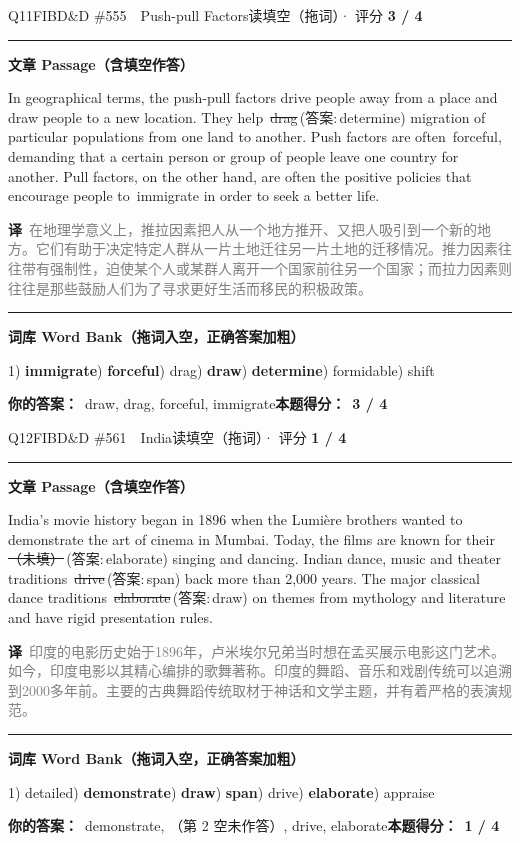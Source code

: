 \documentclass[11pt]{article}
\newcommand{\ptesub}[1]{%
  \par\needspace{2\baselineskip}\smallskip
  {\color{cAccent}\rule[-0.2ex]{3pt}{1.05em}}\hspace{6pt}%
  {\bfseries\color{cHead}#1}\par\nopagebreak\smallskip}
\newcommand{\zh}[1]{{\footnotesize\textcolor{cNote}{\textbf{译}}\ \textcolor{gray}{#1}}}
\newcommand{\rok}[1]{{\color{cFix}\ding{51}\,#1}}                 %
\newcommand{\rno}[2]{{\color{cWrong}\ding{55}\,\sout{#1}}\,{\footnotesize\color{cFix}(答案:\,#2)}}  %
\begin{document}
\begin{qblock}{Q11\quad FIBD\&D \#555\ \ Push-pull Factors}{读填空（拖词）· 评分 \textcolor{cAccent}{\bfseries 3 / 4}}
\ptesub{文章 Passage（含填空作答）}
\begin{promptbox}
In geographical terms, the push-pull factors drive people away from a place and \rok{draw} people to a new location. They help \rno{drag}{determine} migration of particular populations from one land to another. Push factors are often \rok{forceful}, demanding that a certain person or group of people leave one country for another. Pull factors, on the other hand, are often the positive policies that encourage people to \rok{immigrate} in order to seek a better life.
\end{promptbox}
\zh{在地理学意义上，推拉因素把人从一个地方推开、又把人吸引到一个新的地方。它们有助于决定特定人群从一片土地迁往另一片土地的迁移情况。推力因素往往带有强制性，迫使某个人或某群人离开一个国家前往另一个国家；而拉力因素则往往是那些鼓励人们为了寻求更好生活而移民的积极政策。}
\ptesub{词库 Word Bank（拖词入空，正确答案加粗）}
{\small 1) \textbf{immigrate}) \textbf{forceful}) drag) \textbf{draw}) \textbf{determine}) formidable) shift}
\par\smallskip
\textbf{你的答案：}\ draw, {\color{cWrong}drag}, forceful, immigrate\qquad\textbf{本题得分：}\ {\color{cAccent}\bfseries 3 / 4}
\end{qblock}

\begin{qblock}{Q12\quad FIBD\&D \#561\ \ India}{读填空（拖词）· 评分 \textcolor{cAccent}{\bfseries 1 / 4}}
\ptesub{文章 Passage（含填空作答）}
\begin{promptbox}
India's movie history began in 1896 when the Lumière brothers wanted to \rok{demonstrate} the art of cinema in Mumbai. Today, the films are known for their \rno{（未填）}{elaborate} singing and dancing. Indian dance, music and theater traditions \rno{drive}{span} back more than 2,000 years. The major classical dance traditions \rno{elaborate}{draw} on themes from mythology and literature and have rigid presentation rules.
\end{promptbox}
\zh{印度的电影历史始于1896年，卢米埃尔兄弟当时想在孟买展示电影这门艺术。如今，印度电影以其精心编排的歌舞著称。印度的舞蹈、音乐和戏剧传统可以追溯到2000多年前。主要的古典舞蹈传统取材于神话和文学主题，并有着严格的表演规范。}
\ptesub{词库 Word Bank（拖词入空，正确答案加粗）}
{\small 1) detailed) \textbf{demonstrate}) \textbf{draw}) \textbf{span}) drive) \textbf{elaborate}) appraise}
\par\smallskip
\textbf{你的答案：}\ demonstrate, {\color{cWrong}（第 2 空未作答）}, {\color{cWrong}drive, elaborate}\qquad\textbf{本题得分：}\ {\color{cAccent}\bfseries 1 / 4}
\end{qblock}
\end{document}
